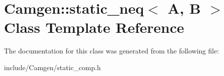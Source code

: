 \hypertarget{a00521}{}\section{Camgen\+:\+:static\+\_\+neq$<$ A, B $>$ Class Template Reference}
\label{a00521}


The documentation for this class was generated from the following file\+:\begin{DoxyCompactItemize}
\item 
include/\+Camgen/static\+\_\+comp.\+h\end{DoxyCompactItemize}
